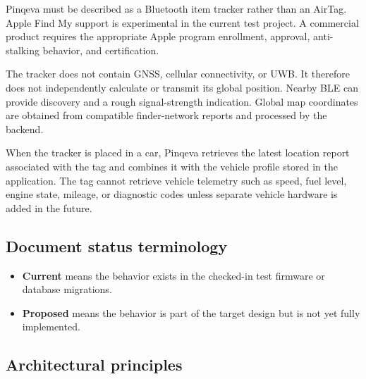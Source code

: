 \documentclass[12pt,a4paper]{article}
\newcommand{\currentstatus}{\textcolor{implemented}{\textbf{Current}}}
\newcommand{\proposedstatus}{\textcolor{proposed}{\textbf{Proposed}}}
\begin{document}
Pinqeva must be described as a Bluetooth item tracker rather than an AirTag.
Apple Find My support is experimental in the current test project. A commercial
product requires the appropriate Apple program enrollment, approval,
anti-stalking behavior, and certification.

The tracker does not contain GNSS, cellular connectivity, or UWB. It therefore
does not independently calculate or transmit its global position. Nearby BLE
can provide discovery and a rough signal-strength indication. Global map
coordinates are obtained from compatible finder-network reports and processed
by the backend.

When the tracker is placed in a car, Pinqeva retrieves the latest location
report associated with the tag and combines it with the vehicle profile stored
in the application. The tag cannot retrieve vehicle telemetry such as speed,
fuel level, engine state, mileage, or diagnostic codes unless separate vehicle
hardware is added in the future.

\subsection{Document status terminology}

\begin{itemize}
    \item \currentstatus{} means the behavior exists in the checked-in test
    firmware or database migrations.
    \item \proposedstatus{} means the behavior is part of the target design but
    is not yet fully implemented.
\end{itemize}

\subsection{Architectural principles}
\end{document}
